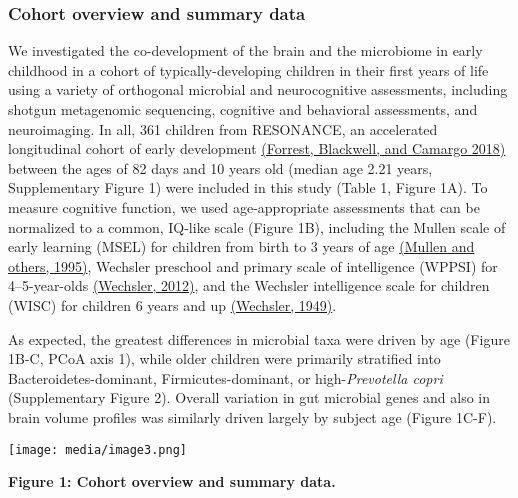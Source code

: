 \subsubsection{Cohort overview and summary data}

We investigated the co-development of the brain and the microbiome in
early childhood in a cohort of typically-developing children in their
first years of life using a variety of orthogonal microbial and
neurocognitive assessments, including shotgun metagenomic sequencing,
cognitive and behavioral assessments, and neuroimaging. In all, 361
children from RESONANCE, an accelerated longitudinal cohort of early
development \href{https://paperpile.com/c/dPbU4e/klxU}{(Forrest,
Blackwell, and Camargo 2018)} between the ages of 82 days and 10 years
old (median age 2.21 years, Supplementary Figure 1) were included in
this study (Table 1, Figure 1A). To measure cognitive function, we used
age-appropriate assessments that can be normalized to a common, IQ-like
scale (Figure 1B), including the Mullen scale of early learning (MSEL)
for children from birth to 3 years of age
\href{https://www.zotero.org/google-docs/?90hfYr}{(Mullen and others,
1995)}, Wechsler preschool and primary scale of intelligence (WPPSI) for
4--5-year-olds
\href{https://www.zotero.org/google-docs/?wCfx5h}{(Wechsler, 2012)}, and
the Wechsler intelligence scale for children (WISC) for children 6 years
and up \href{https://www.zotero.org/google-docs/?AcNN3S}{(Wechsler,
1949)}.

As expected, the greatest differences in microbial taxa were driven by
age (Figure 1B-C, PCoA axis 1), while older children were primarily
stratified into Bacteroidetes-dominant, Firmicutes-dominant, or
high-\emph{Prevotella copri} (Supplementary Figure 2). Overall variation
in gut microbial genes and also in brain volume profiles was similarly
driven largely by subject age (Figure 1C-F).

\texttt{[image: media/image3.png]}

\textbf{Figure 1: Cohort overview and summary data.}

